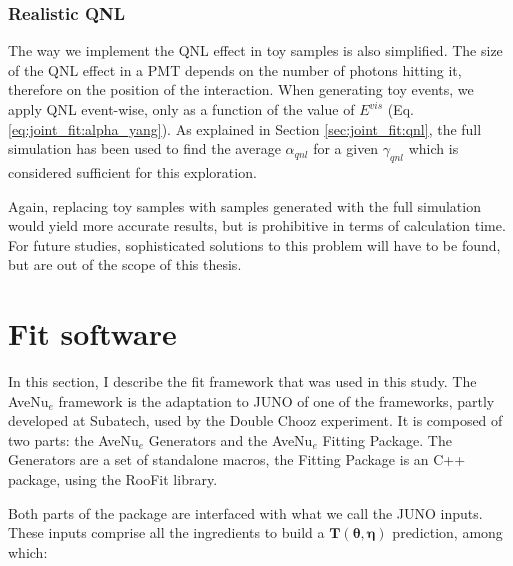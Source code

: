 \documentclass[../main.tex]{subfiles}
\begin{document}
\subsubsection{Realistic QNL}

The way we implement the QNL effect in toy samples is also simplified. The size of the QNL effect in a PMT depends on the number of photons hitting it, therefore on the position of the interaction. When generating toy events, we apply QNL event-wise, only as a function of the value of $E^{vis}$ (Eq. \ref{eq:joint_fit:alpha_yang}). As explained in Section \ref{sec:joint_fit:qnl}, the full simulation has been used to find the average $\alpha_{qnl}$ for a given $\gamma_{qnl}$ which is considered sufficient for this exploration.

Again, replacing toy samples with samples generated with the full simulation would yield more accurate results, but is prohibitive in terms of calculation time. For future studies, sophisticated solutions to this problem  will have to be found, but are out of the scope of this thesis.


\section{Fit software}
\label{sec:joint_fit:framework}

In this section, I describe the fit framework that was used in this study. The AveNu$_e$ framework is the adaptation to JUNO of one of the frameworks, partly developed at Subatech, used by the Double Chooz \cite{double_chooz_collaboration_double_2022} experiment. It is composed of two parts: the AveNu$_e$ Generators and the AveNu$_e$ Fitting Package. The Generators are a set of standalone macros, the Fitting Package is an C++ package, using the RooFit library.


Both parts of the package are interfaced with what we call the JUNO inputs.
These inputs comprise all the ingredients to build a $\bm{T}(\bm{\theta}, \bm{\eta})$ prediction, among which:
\end{document}
